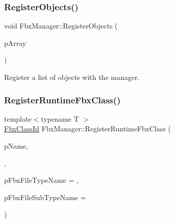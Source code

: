 \subsubsection{\texorpdfstring{Register\+Objects()}{RegisterObjects()}}
{\footnotesize\ttfamily void Fbx\+Manager\+::\+Register\+Objects (\begin{DoxyParamCaption}\item[{const \hyperlink{class_fbx_array}{Fbx\+Array}$<$ \hyperlink{class_fbx_object}{Fbx\+Object} $\ast$$>$ \&}]{p\+Array }\end{DoxyParamCaption})}

Register a list of objects with the manager. \mbox{\label{class_fbx_manager_ae7669c6398bfbe4bbf3fcb3206df17b0}} 
\subsubsection{\texorpdfstring{Register\+Runtime\+Fbx\+Class()}{RegisterRuntimeFbxClass()}}
{\footnotesize\ttfamily template$<$typename T $>$ \\
\hyperlink{class_fbx_class_id}{Fbx\+Class\+Id} Fbx\+Manager\+::\+Register\+Runtime\+Fbx\+Class (\begin{DoxyParamCaption}\item[{const char $\ast$}]{p\+Name,  }\item[{const T $\ast$}]{,  }\item[{const char $\ast$}]{p\+Fbx\+File\+Type\+Name = {},  }\item[{const char $\ast$}]{p\+Fbx\+File\+Sub\+Type\+Name = {} }\end{DoxyParamCaption})\hspace{0.3cm}{\ttfamily [inline]}}

